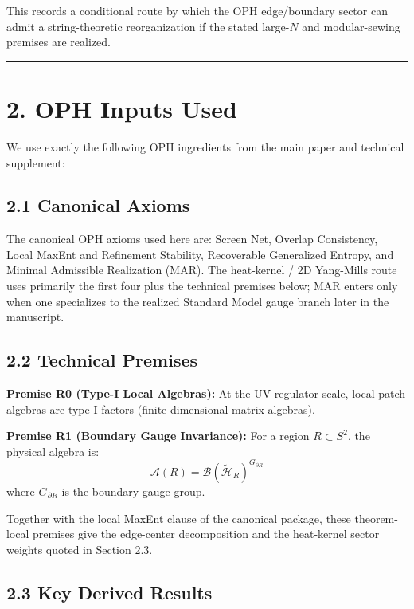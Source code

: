 This records a conditional route by which the OPH edge/boundary sector can admit a string-theoretic reorganization if the stated large-\(N\) and modular-sewing premises are realized.

\begin{center}\rule{0.5\linewidth}{0.5pt}\end{center}

\section{2. OPH Inputs Used}\label{2-oph-inputs-used}

We use exactly the following OPH ingredients from the main paper and technical supplement:

\subsection{2.1 Canonical Axioms}\label{21-core-axioms}

The canonical OPH axioms used here are: Screen Net, Overlap Consistency, Local MaxEnt and Refinement Stability, Recoverable Generalized Entropy, and Minimal Admissible Realization (MAR). The heat-kernel / 2D Yang-Mills route uses primarily the first four plus the technical premises below; MAR enters only when one specializes to the realized Standard Model gauge branch later in the manuscript.

\subsection{2.2 Technical Premises}\label{22-regulator-premises}

\textbf{Premise R0 (Type-I Local Algebras):} At the UV regulator scale, local patch algebras are type-I factors (finite-dimensional matrix algebras).

\textbf{Premise R1 (Boundary Gauge Invariance):} For a region \(R \subset S^2\), the physical algebra is: \[\mathcal{A}(R) = \mathcal{B}(\tilde{\mathcal{H}}_R)^{G_{\partial R}}\] where \(G_{\partial R}\) is the boundary gauge group.

Together with the local MaxEnt clause of the canonical package, these theorem-local premises give the edge-center decomposition and the heat-kernel sector weights quoted in Section 2.3.

\subsection{2.3 Key Derived Results}\label{23-key-derived-results}

